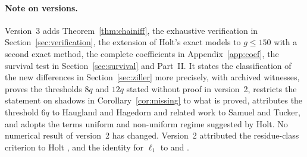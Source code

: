 \documentclass[11pt]{article}
\theoremstyle{definition}
\theoremstyle{remark}
\begin{document}
\paragraph{Note on versions.} Version~3 adds Theorem~\ref{thm:chainiff}, the exhaustive verification in Section~\ref{sec:verification}, the extension of Holt's exact models to $g \le 150$ with a second exact method, the complete coefficients in Appendix~\ref{app:coef}, the survival test in Section~\ref{sec:survival} and Part~II. It states the classification of the new differences in Section~\ref{sec:ziller} more precisely, with archived witnesses, proves the thresholds $8q$ and $12q$ stated without proof in version~2, restricts the statement on shadows in Corollary~\ref{cor:missing} to what is proved, attributes the threshold $6q$ to Haugland and Hagedorn and related work to Samuel and Tucker, and adopts the terms uniform and non-uniform regime suggested by Holt. No numerical result of version~2 has changed. Version~2 attributed the residue-class criterion to Holt \cite[Lemma~3.1]{Ho25}, and the identity for $\ell_1$ to \cite[Thm.~1.1]{Ho26} and \cite[Cor.~1.2]{Ho25}.

\appendix
\end{document}

